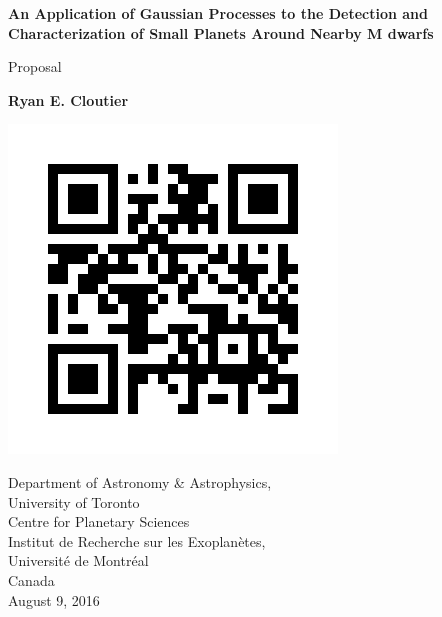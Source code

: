 \begin{titlepage}
    \begin{center}
        \vspace*{1cm}
        
        \Huge
	\textbf{An Application of Gaussian Processes to the Detection 
	and Characterization of Small Planets Around Nearby M dwarfs}        

        \vspace{0.5cm}
        \LARGE
        Proposal
        
        \vspace{1.5cm}
        
        \textbf{Ryan E. Cloutier}
        
        
        
        \vspace{0.7cm}
        
        \includegraphics[scale=.5]{figures/static_qr_code_without_logo.jpg}
        
	\vfill

        \Large
        Department of Astronomy \& Astrophysics,\\University of Toronto\\
	Centre for Planetary Sciences\\
	Institut de Recherche sur les Exoplan\`{e}tes,\\Universit\'{e} de Montr\'{e}al\\
        Canada\\
        August 9, 2016
        
    \end{center}
\end{titlepage}
